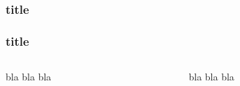 \documentclass[aspectratio=169]{beamer}
\begin{document}
\begin{frame}
\frametitle{title}
\lipsum[2]
\end{frame}

\begin{frame}
\frametitle{title}
\begin{columns}[onlytextwidth]
    \begin{column}{.45\textwidth}
        bla bla bla
    \end{column}
    \begin{column}{.45\textwidth}
        bla bla bla
    \end{column}
\end{columns}
\end{frame}
\end{document}
